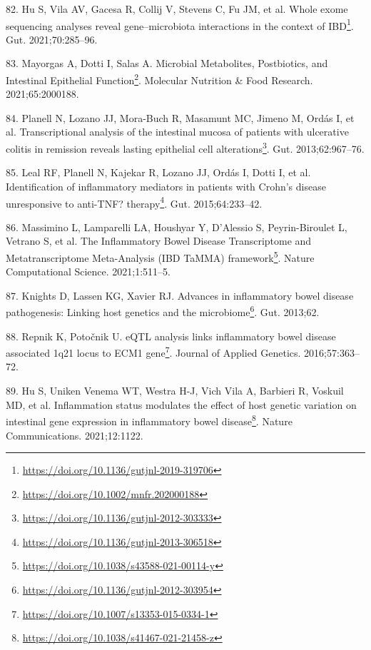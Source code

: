 \documentclass[
  a4paper,
]{book}
\DeclareRobustCommand{\href}[2]{#2\footnote{\url{#1}}}
\newlength{\cslhangindent}
\newlength{\cslentryspacingunit} %
\newenvironment{CSLReferences}[2] %
 {%
  \setlength{\parindent}{0pt}
  \ifodd #1
  \let\oldpar\par
  \def\par{\hangindent=\cslhangindent\oldpar}
  \fi
  \setlength{\parskip}{#2\cslentryspacingunit}
 }%
 {}
\begin{document}
\begin{CSLReferences}{0}{0}
\leavevmode{}%
82. Hu S, Vila AV, Gacesa R, Collij V, Stevens C, Fu JM, et al. \href{https://doi.org/10.1136/gutjnl-2019-319706}{Whole exome sequencing analyses reveal gene--microbiota interactions in the context of IBD}. Gut. 2021;70:285--96.

\leavevmode{}%
83. Mayorgas A, Dotti I, Salas A. \href{https://doi.org/10.1002/mnfr.202000188}{Microbial Metabolites, Postbiotics, and Intestinal Epithelial Function}. Molecular Nutrition \& Food Research. 2021;65:2000188.

\leavevmode{}%
84. Planell N, Lozano JJ, Mora-Buch R, Masamunt MC, Jimeno M, Ordás I, et al. \href{https://doi.org/10.1136/gutjnl-2012-303333}{Transcriptional analysis of the intestinal mucosa of patients with ulcerative colitis in remission reveals lasting epithelial cell alterations}. Gut. 2013;62:967--76.

\leavevmode{}%
85. Leal RF, Planell N, Kajekar R, Lozano JJ, Ordás I, Dotti I, et al. \href{https://doi.org/10.1136/gutjnl-2013-306518}{Identification of inflammatory mediators in patients with Crohn's disease unresponsive to anti-TNF? therapy}. Gut. 2015;64:233--42.

\leavevmode{}%
86. Massimino L, Lamparelli LA, Houshyar Y, D'Alessio S, Peyrin-Biroulet L, Vetrano S, et al. \href{https://doi.org/10.1038/s43588-021-00114-y}{The Inflammatory Bowel Disease Transcriptome and Metatranscriptome Meta-Analysis (IBD TaMMA) framework}. Nature Computational Science. 2021;1:511--5.

\leavevmode{}%
87. Knights D, Lassen KG, Xavier RJ. \href{https://doi.org/10.1136/gutjnl-2012-303954}{Advances in inflammatory bowel disease pathogenesis: Linking host genetics and the microbiome}. Gut. 2013;62.

\leavevmode{}%
88. Repnik K, Potočnik U. \href{https://doi.org/10.1007/s13353-015-0334-1}{eQTL analysis links inflammatory bowel disease associated 1q21 locus to ECM1 gene}. Journal of Applied Genetics. 2016;57:363--72.

\leavevmode{}%
89. Hu S, Uniken Venema WT, Westra H-J, Vich Vila A, Barbieri R, Voskuil MD, et al. \href{https://doi.org/10.1038/s41467-021-21458-z}{Inflammation status modulates the effect of host genetic variation on intestinal gene expression in inflammatory bowel disease}. Nature Communications. 2021;12:1122.


\end{CSLReferences}
\end{document}
